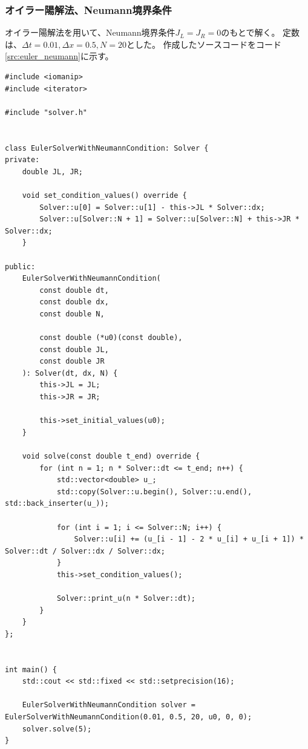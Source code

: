 \documentclass[a4j, titlepage]{jsarticle}
\numberwithin{equation}{section}
\begin{document}
        \subsubsection{オイラー陽解法、Neumann境界条件}
            オイラー陽解法を用いて、Neumann境界条件$J_L = J_R = 0$のもとで解く。
            定数は、$\Delta t = 0.01, \Delta x = 0.5, N = 20$とした。
            作成したソースコードをコード\ref{src:euler_neumann}に示す。
            \begin{lstlisting}[caption=オイラー陽解法を用いてNeumann境界条件のもとで解くソースコード, label=src:euler_neumann]
#include <iomanip>
#include <iterator>

#include "solver.h"


class EulerSolverWithNeumannCondition: Solver {
private:
    double JL, JR;

    void set_condition_values() override {
        Solver::u[0] = Solver::u[1] - this->JL * Solver::dx;
        Solver::u[Solver::N + 1] = Solver::u[Solver::N] + this->JR * Solver::dx;
    }

public:
    EulerSolverWithNeumannCondition(
        const double dt,
        const double dx,
        const double N,

        const double (*u0)(const double),
        const double JL,
        const double JR
    ): Solver(dt, dx, N) {
        this->JL = JL;
        this->JR = JR;

        this->set_initial_values(u0);
    }

    void solve(const double t_end) override {
        for (int n = 1; n * Solver::dt <= t_end; n++) {
            std::vector<double> u_;
            std::copy(Solver::u.begin(), Solver::u.end(), std::back_inserter(u_));

            for (int i = 1; i <= Solver::N; i++) {
                Solver::u[i] += (u_[i - 1] - 2 * u_[i] + u_[i + 1]) * Solver::dt / Solver::dx / Solver::dx;
            }
            this->set_condition_values();
            
            Solver::print_u(n * Solver::dt);
        }
    }
};


int main() {
    std::cout << std::fixed << std::setprecision(16);

    EulerSolverWithNeumannCondition solver = EulerSolverWithNeumannCondition(0.01, 0.5, 20, u0, 0, 0);
    solver.solve(5);
}\end{lstlisting}
\end{document}
